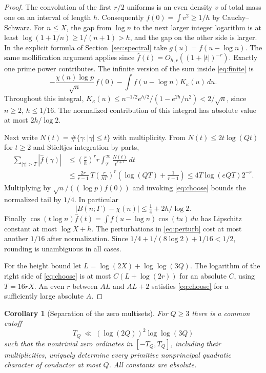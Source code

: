 \documentclass[11pt,letterpaper]{article}
\newtheorem{corollary}[theorem]{Corollary}
\theoremstyle{remark}\newtheorem{remark}[theorem]{Remark}
\begin{document}
\begin{proof}
The convolution of the first $r/2$ uniforms is an even density $v$ of total mass one on an interval of length $h$. Consequently $f(0)=\int v^2\ge1/h$ by Cauchy--Schwarz. For $n\le X$, the gap from $\log n$ to the next larger integer logarithm is at least $\log(1+1/n)\ge1/(n+1)>h$, and the gap on the other side is larger. In the explicit formula of Section~\ref{sec:spectral} take $g(u)=f(u-\log n)$. The same mollification argument applies since $\widehat f(t)=O_{h,r}((1+|t|)^{-r})$. Exactly one prime power contributes. The infinite version of the sum inside \eqref{eq:finite} is
\[
   -\frac{\chi(n)\log p}{\sqrt n}\,f(0)
          -\int f(u-\log n)K_\kappa(u)\,du.
\]
Throughout this integral, $K_\kappa(u)\le n^{-1/2}e^{h/2}/(1-e^{2h}/n^2)<2/\sqrt n$, since $n\ge2$, $h\le1/16$. The normalized contribution of this integral has absolute value at most $2h/\log2$.

Next write $N(t)=\#\{\gamma:|\gamma|\le t\}$ with multiplicity. From $N(t)\le2t\log(Qt)$ for $t\ge2$ and Stieltjes integration by parts,
\begin{align*}
 \sum_{|\gamma|>T}|\widehat f(\gamma)|
 &\le \left(\frac rh\right)^r r\int_T^\infty
                        \frac{N(t)}{t^{r+1}}\,dt\\
 &\le \frac{2r}{r-1}\,T\left(\frac{r}{hT}\right)^r
             \left(\log(QT)+\frac{1}{r-1}\right)
 \le 4 T\log(eQT)2^{-r}.
\end{align*}
Multiplying by $\sqrt n/((\log p)f(0))$ and invoking \eqref{eq:choose} bounds the normalized tail by $1/4$. In particular
\[
  |B(n;\Gamma)-\chi(n)|\le\tfrac14+2h/\log 2.
\]
Finally $\cos(t\log n)\widehat f(t)=\int f(u-\log n)\cos(tu)\,du$ has Lipschitz constant at most $\log X+h$. The perturbations in \eqref{eq:perturb} cost at most another $1/16$ after normalization. Since $1/4+1/(8\log2)+1/16<1/2$, rounding is unambiguous in all cases.

For the height bound let $L=\log(2X)+\log\log(3Q)$. The logarithm of the right side of \eqref{eq:choose} is at most $C(L+\log(2r))$ for an absolute $C$, using $T=16rX$. An even $r$ between $AL$ and $AL+2$ satisfies \eqref{eq:choose} for a sufficiently large absolute $A$.
\end{proof}

\begin{corollary}[Separation of the zero multisets]\label{cor:identity}
For $Q\ge3$ there is a common cutoff
\[
    T_Q\ \ll\ (\log(2Q))^2\log\log(3Q)
\]
such that the nontrivial zero ordinates in $[-T_Q,T_Q]$, including their multiplicities, uniquely determine every primitive nonprincipal quadratic character of conductor at most $Q$. All constants are absolute.
\end{corollary}
\end{document}
